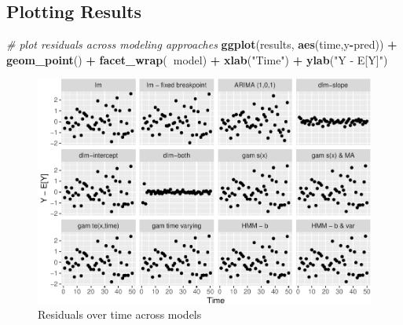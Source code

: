 \documentclass[]{article}
\newenvironment{Shaded}{\begin{snugshade}}{\end{snugshade}}
\newcommand{\CommentTok}[1]{\textcolor[rgb]{0.56,0.35,0.01}{\textit{#1}}}
\newcommand{\DataTypeTok}[1]{\textcolor[rgb]{0.13,0.29,0.53}{#1}}
\newcommand{\KeywordTok}[1]{\textcolor[rgb]{0.13,0.29,0.53}{\textbf{#1}}}
\newcommand{\NormalTok}[1]{#1}
\newcommand{\OperatorTok}[1]{\textcolor[rgb]{0.81,0.36,0.00}{\textbf{#1}}}
\newcommand{\StringTok}[1]{\textcolor[rgb]{0.31,0.60,0.02}{#1}}
\begin{document}
\hypertarget{plotting-results}{%
\subsection{Plotting Results}\label{plotting-results}}

\begin{Shaded}
\end{Shaded}

\begin{Shaded}
\begin{Highlighting}[]
\CommentTok{# plot residuals across modeling approaches}
\KeywordTok{ggplot}\NormalTok{(results, }\KeywordTok{aes}\NormalTok{(time,y}\OperatorTok{-}\NormalTok{pred)) }\OperatorTok{+}\StringTok{ }\KeywordTok{geom_point}\NormalTok{() }\OperatorTok{+}\StringTok{ }
\StringTok{  }\KeywordTok{facet_wrap}\NormalTok{(}\OperatorTok{~}\NormalTok{model) }\OperatorTok{+}\StringTok{ }\KeywordTok{xlab}\NormalTok{(}\StringTok{"Time"}\NormalTok{) }\OperatorTok{+}\StringTok{ }\KeywordTok{ylab}\NormalTok{(}\StringTok{"Y - E[Y]"}\NormalTok{)}
\end{Highlighting}
\end{Shaded}

\begin{figure}
\centering
\includegraphics{univariate-time-series-examples_files/figure-latex/unnamed-chunk-7-1.pdf}
\caption{Residuals over time across models}
\end{figure}
\end{document}
